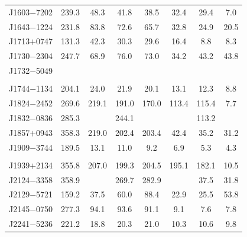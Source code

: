 \documentclass[useAMS,usenatbib]{mn2e}
\begin{document}
\begin{table}
\begin{center}
\begin{tabular}{lccccccc}
J1603$-$7202     &  239.3      & 48.3      & 41.8   & 38.5   & 32.4  & 29.4  & 7.0             \\
J1643$-$1224     &  231.8      & 83.8      & 72.6   & 65.7   & 32.8  & 24.9  & 20.5             \\
J1713$+$0747     &  131.3      & 42.3      & 30.3   & 29.6   & 16.4  & 8.8   & 8.3             \\
J1730$-$2304     &  247.7      & 68.9      & 76.0   & 73.0   & 34.2  & 43.2  & 43.8             \\
J1732$-$5049     &        &      &   &   &   &   &              \\
	               &        &      &   &   &   &   &              \\
J1744$-$1134     &  204.1      & 24.0      & 21.9   & 20.1   & 13.1  & 12.3  & 8.8             \\
J1824$-$2452     &  269.6      & 219.1     & 191.0  & 170.0  & 113.4  &115.4   &7.7              \\
J1832$-$0836     &  285.3      &           & 244.1  &   &       & 113.2  &              \\
J1857$+$0943     &  358.3      & 219.0     & 202.4  & 203.4  & 42.4  & 35.2  & 31.2             \\
J1909$-$3744     &  189.5      & 13.1      & 11.0   & 9.2    & 6.9  &  5.3   & 4.3             \\
	               &        &      &   &   &   &   &              \\
J1939$+$2134     &  355.8      & 207.0     & 199.3  & 204.5  & 195.1  &182.1   & 10.5              \\
J2124$-$3358     &  358.9      &           & 269.7  & 282.9  &       & 37.5  & 31.8             \\
J2129$-$5721     &  159.2      & 37.5      & 60.0   & 88.4   & 22.9  & 25.5  & 53.8             \\
J2145$-$0750     &  277.3      & 94.1      & 93.6   & 91.1   & 9.1   & 7.6   & 7.8             \\
J2241$-$5236     &  221.2      & 18.8      & 20.3   & 21.0   & 10.3  & 10.6  & 9.8             \\
\hline
\end{tabular}
\end{center}
\end{table}
\end{document}
